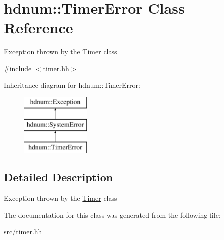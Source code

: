 \hypertarget{classhdnum_1_1TimerError}{
\section{hdnum::TimerError Class Reference}
\label{classhdnum_1_1TimerError}
}


Exception thrown by the \hyperlink{classhdnum_1_1Timer}{Timer} class  




{\ttfamily \#include $<$timer.hh$>$}

Inheritance diagram for hdnum::TimerError:\begin{figure}[H]
\begin{center}
\leavevmode
\includegraphics[height=3cm]{classhdnum_1_1TimerError}
\end{center}
\end{figure}


\subsection{Detailed Description}
Exception thrown by the \hyperlink{classhdnum_1_1Timer}{Timer} class 

The documentation for this class was generated from the following file:\begin{DoxyCompactItemize}
\item 
src/\hyperlink{timer_8hh}{timer.hh}\end{DoxyCompactItemize}

